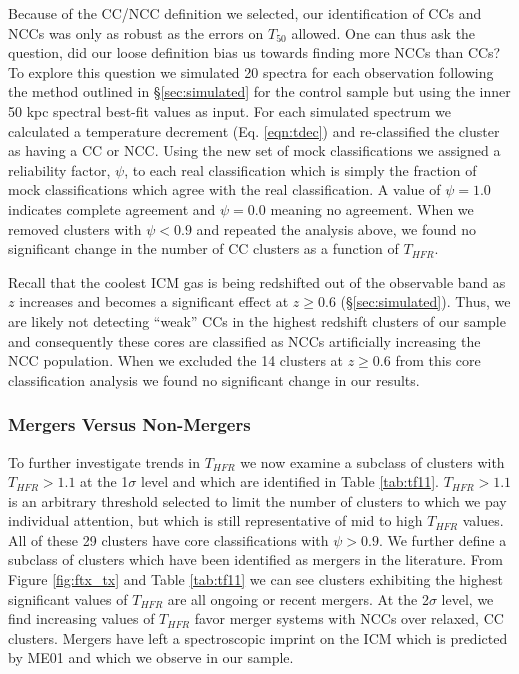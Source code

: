 \documentclass{emulateapj}
\begin{document}
Because of the CC/NCC definition we selected, our identification of
CCs and NCCs was only as robust as the errors on $T_{50}$ allowed. One can
thus ask the question, did our loose definition bias us towards
finding more NCCs than CCs? To explore this question we simulated 20
spectra for each observation following the method outlined in
\S\ref{sec:simulated} for the control sample but using the inner 50
kpc spectral best-fit values as input. For each simulated spectrum we
calculated a temperature decrement (Eq. \ref{eqn:tdec}) and
re-classified the cluster as having a CC or NCC. Using the new set of
mock classifications we assigned a reliability factor, $\psi$, to each
real classification which is simply the fraction of mock
classifications which agree with the real classification. A value of
$\psi = 1.0$ indicates complete agreement and $\psi = 0.0$ meaning no
agreement. When we removed clusters with $\psi < 0.9$ and repeated the
analysis above, we found no significant change in the number of CC
clusters as a function of $T_{HFR}$.

Recall that the coolest ICM gas is being redshifted out of the
observable band as $z$ increases and becomes a significant effect at
$z \geq 0.6$ (\S\ref{sec:simulated}). Thus, we are likely not detecting
``weak'' CCs in the highest redshift clusters of our sample and
consequently these cores are classified as NCCs artificially increasing
the NCC population. When we excluded the 14 clusters at $z \geq 0.6$
from this core classification analysis we found no significant change
in our results.

\subsubsection{Mergers Versus Non-Mergers}\label{sec:merge}

To further investigate trends in $T_{HFR}$ we now examine a subclass of
clusters with $T_{HFR} > 1.1$ at the 1$\sigma$ level and which are
identified in Table \ref{tab:tf11}. $T_{HFR} > 1.1$ is an arbitrary
threshold selected to limit the number of clusters to which we pay
individual attention, but which is still representative of mid to high
$T_{HFR}$ values. All of these 29 clusters have core classifications 
with $\psi > 0.9$. We further define a subclass of clusters which have
been identified as mergers in the literature. From Figure
\ref{fig:ftx_tx} and Table \ref{tab:tf11} we can see clusters
exhibiting the highest significant values of $T_{HFR}$ are all ongoing or
recent mergers. At the 2$\sigma$ level, we find increasing values of
$T_{HFR}$ favor merger systems with NCCs over relaxed, CC clusters. Mergers
have left a spectroscopic imprint on the ICM which is predicted by
ME01 and which we observe in our sample.
\end{document}
